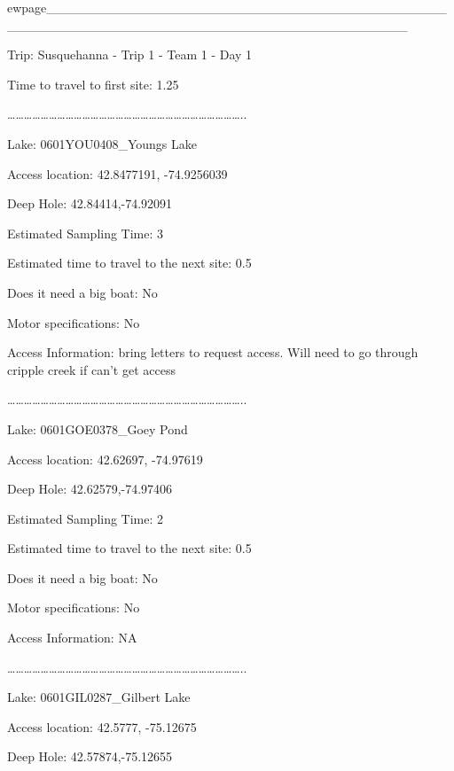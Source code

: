 \documentclass[]{article}
\title{}
\author{}
\date{}
\begin{document}
ewpage\_\_\_\_\_\_\_\_\_\_\_\_\_\_\_\_\_\_\_\_\_\_\_\_\_\_\_\_\_\_\_\_\_\_\_\_\_\_\_\_\_\_\_\_\_\_\_\_\_\_\_\_\_\_\_\_\_\_\_\_\_\_\_\_\_\_\_\_\_\_\_\_\_\_\_\_\_\_\_\_\_\_\_\_\_\_

Trip: Susquehanna - Trip 1 - Team 1 - Day 1

Time to travel to first site: 1.25

\ldots{}\ldots{}\ldots{}\ldots{}\ldots{}\ldots{}\ldots{}\ldots{}\ldots{}\ldots{}\ldots{}\ldots{}\ldots{}\ldots{}\ldots{}\ldots{}\ldots{}\ldots{}\ldots{}\ldots{}\ldots{}\ldots{}\ldots{}\ldots{}\ldots{}\ldots{}\ldots{}\ldots{}..

Lake: 0601YOU0408\_Youngs Lake

Access location: 42.8477191, -74.9256039

Deep Hole: 42.84414,-74.92091

Estimated Sampling Time: 3

Estimated time to travel to the next site: 0.5

Does it need a big boat: No

Motor specifications: No

Access Information: bring letters to request access. Will need to go
through cripple creek if can't get access

\ldots{}\ldots{}\ldots{}\ldots{}\ldots{}\ldots{}\ldots{}\ldots{}\ldots{}\ldots{}\ldots{}\ldots{}\ldots{}\ldots{}\ldots{}\ldots{}\ldots{}\ldots{}\ldots{}\ldots{}\ldots{}\ldots{}\ldots{}\ldots{}\ldots{}\ldots{}\ldots{}\ldots{}..

Lake: 0601GOE0378\_Goey Pond

Access location: 42.62697, -74.97619

Deep Hole: 42.62579,-74.97406

Estimated Sampling Time: 2

Estimated time to travel to the next site: 0.5

Does it need a big boat: No

Motor specifications: No

Access Information: NA

\ldots{}\ldots{}\ldots{}\ldots{}\ldots{}\ldots{}\ldots{}\ldots{}\ldots{}\ldots{}\ldots{}\ldots{}\ldots{}\ldots{}\ldots{}\ldots{}\ldots{}\ldots{}\ldots{}\ldots{}\ldots{}\ldots{}\ldots{}\ldots{}\ldots{}\ldots{}\ldots{}\ldots{}..

Lake: 0601GIL0287\_Gilbert Lake

Access location: 42.5777, -75.12675

Deep Hole: 42.57874,-75.12655
\end{document}
